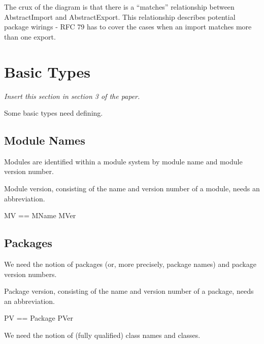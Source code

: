 \documentclass[a4paper,9pt]{article}
\begin{document}
The crux of the diagram is that there is a ``matches'' relationship between
AbstractImport and AbstractExport.
This relationship describes potential package wirings - RFC 79 has to cover
the cases when an import matches more than one export.


\clearpage
\section{Basic Types}
\label{cha:basics}
\textit{Insert this section in section 3 of the paper.}

Some basic types need defining.

\subsection*{Module Names}

Modules are identified within a module system by module name
and module version number.
\begin{zed}
\end{zed}

Module version, consisting of the name and version number of a module,
needs an abbreviation.
\begin{zed}
  MV == MName \cross MVer
\end{zed}

\subsection*{Packages}
We need the notion of packages (or, more precisely, package names)
and package version numbers.
\begin{zed}
\end{zed}


Package version, consisting of the name and version number of a package,
needs an abbreviation.
\begin{zed}
  PV == Package \cross PVer
\end{zed}

We need the notion of (fully qualified) class names and classes.
\begin{zed}
\end{zed}
\end{document}
